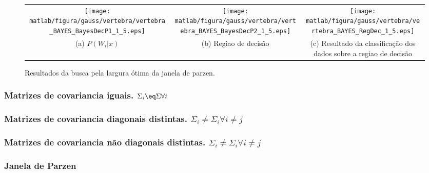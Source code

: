 \documentclass[ 
	article,			%
	11pt,				%
	oneside,			%
	a4paper,			%
	english,			%
	brazil,				%
	]{abntex2}
\begin{document}
\begin{figure}
\begin{tabular}{ccc}
      \texttt{[image: matlab/figura/gauss/vertebra/vertebra\_BAYES\_BayesDecP1\_1\_5.eps]}
      &
	  \texttt{[image: matlab/figura/gauss/vertebra/vertebra\_BAYES\_BayesDecP2\_1\_5.eps]}
	  &
	  \texttt{[image: matlab/figura/gauss/vertebra/vertebra\_BAYES\_RegDec\_1\_5.eps]}
	  \\		  	  
	 \multicolumn{1}{p{40mm}}{(a) $P(W_i|x)$}
	 &
	 \multicolumn{1}{p{40mm}}{(b) Regiao de decisão}
	 &
	 \multicolumn{1}{p{40mm}}{(c) Resultado
	 da classificação dos dados sobre a regiao de decisão}
	 
	 
	\end{tabular}
	\caption{Resultados da busca pela largura ótima da janela de parzen.}

\end{figure}




\subsubsection{ Matrizes de covariancia iguais. $ \Sigma _i \eq \Sigma \forall i
$ }

\subsubsection{ Matrizes de covariancia diagonais distintas. $\Sigma_i \neq
\Sigma_i \forall i \neq j $ } 


\subsubsection{ Matrizes de covariancia não diagonais distintas. $\Sigma_i \neq
\Sigma_i \forall i \neq j $ }

\subsubsection{Janela de Parzen}
\end{document}
